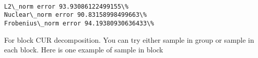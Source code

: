 \documentclass[11pt]{article}
\begin{document}
    \begin{center}
    \end{center}
    { \hspace*{\fill} \\}
    
    \begin{Verbatim}[commandchars=\\\{\}]
L2\_norm error 93.93086122499155\%
Nuclear\_norm error 90.83158998499663\%
Frobenius\_norm error 94.19380930636433\%

    \end{Verbatim}

    For block CUR decomposition. You can try either sample in group or
sample in each block. Here is one example of sample in block
\end{document}
